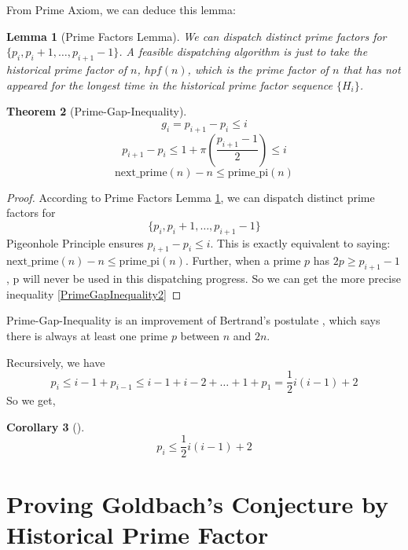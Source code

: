\documentclass[12pt,a4paper,reqno]{amsart}
\numberwithin{equation}{section}
\theoremstyle{plain}
\newtheorem{theorem}{Theorem}[section]
\newtheorem{lemma}[theorem]{Lemma}
\newtheorem{corollary}[theorem]{Corollary}
\theoremstyle{definition}
\begin{document}
	From Prime Axiom, we can deduce this lemma:
	\begin{lemma}[Prime Factors Lemma]\label{PrimeFactorsLemma}
		We can dispatch distinct prime factors for $\{p_i,p_i+1,\dots,p_{i+1}-1\}$. 
		A feasible dispatching algorithm is just to take the historical prime factor 
		of $n$, $hpf(n)$, which is the prime factor of $n$ that has not appeared for 
		the longest time in the historical prime factor sequence $\{H_i\}$. 
	\end{lemma}
	
	\begin{theorem}[Prime-Gap-Inequality]\label{PrimeGapInequality}
		\begin{equation}\label{PrimeGapInequality1}
			 g_i=p_{i+1}-p_{i} \leq i
		\end{equation}
		\begin{equation}\label{PrimeGapInequality2}
			p_{i+1}-p_{i} \leq 1+ \pi (\frac{p_{i+1}-1}{2}) \leq i
		\end{equation}
		\begin{equation}\label{NextPrimeInequality3}
			\text{next\_prime}(n)-n  \leq \text{prime\_pi}(n)
		\end{equation}
	\end{theorem}
	\begin{proof} 
		 According to Prime Factors Lemma \ref{PrimeFactorsLemma}, we can dispatch distinct prime 
		 factors for
		  \[\{p_i,p_i+1,\dots,p_{i+1}-1\}\]
		 Pigeonhole Principle ensures $p_{i+1}-p_{i} \leq i$. This is exactly equivalent 
		 to saying: $\text{next\_prime}(n)-n  \leq \text{prime\_pi}(n)$. Further, when a prime 
		 $p$ has $2p \ge p_{i+1}-1$ , p will never be used in this dispatching progress. 
		 So we can get the more precise inequality \eqref{PrimeGapInequality2}
	\end{proof}
	
	Prime-Gap-Inequality is an improvement of Bertrand's postulate \cite{RamBert19}, 
	which says there is always at least one prime $p$ between $n$ and $2n$.
	
	Recursively, we have
	\[p_i \leq i-1+p_{i-1} \leq i-1 + i-2 + \ldots +1 +p_1= \frac{1}{2} i(i-1)+2\]
	So we get,
	\begin{corollary}[]
		\begin{equation}
			p_{i} \leq \frac{1}{2}i(i-1)+2
		\end{equation}
	\end{corollary}
	
	\section{Proving Goldbach's Conjecture by Historical Prime Factor}
	
\end{document}

